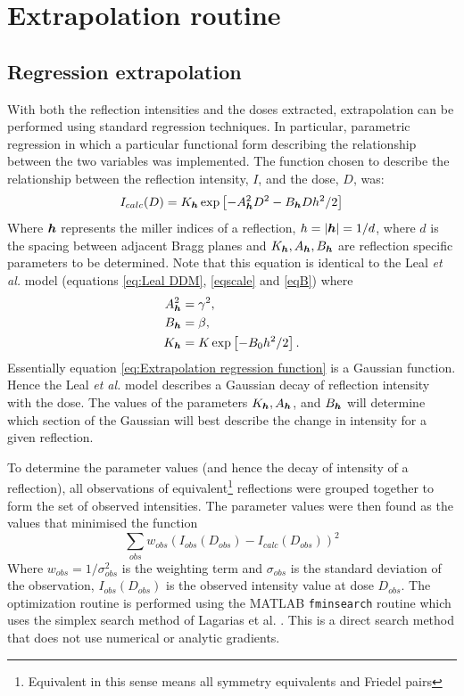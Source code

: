 \section{Extrapolation routine}
\label{sec:Extrapolation routine}

\subsection{Regression extrapolation}
\label{sub:Regression extrapolation}
With both the reflection intensities and the doses extracted, extrapolation can be performed using standard regression techniques.
In particular, parametric regression in which a particular functional form describing the relationship between the two variables was implemented.
The function chosen to describe the relationship between the reflection intensity, $I$, and the dose, $D$, was:
\begin{equation}
    I_{calc}(D) = K_{\boldsymbol{h}} \exp \left[- A^2_{\boldsymbol{h}}D^2 - B_{\boldsymbol{h}}D h^2/2 \right]
    \label{eq:Extrapolation regression function}
\end{equation}
Where $\boldsymbol{h}$ represents the miller indices of a reflection, $h = |\boldsymbol{h}| = 1/d$, where $d$ is the spacing between adjacent Bragg planes and $K_{\boldsymbol{h}}, A_{\boldsymbol{h}}, B_{\boldsymbol{h}}$ are reflection specific parameters to be determined.
Note that this equation is identical to the Leal \textit{et al.} model (equations \ref{eq:Leal DDM}, \ref{eqscale} and \ref{eqB}) where
\begin{align}
    A^2_{\boldsymbol{h}} &= \gamma^2, \\
    B_{\boldsymbol{h}} &= \beta, \\
    K_{\boldsymbol{h}} &= K\exp \left[ -B_0 h^2/2 \right].
\end{align}
Essentially equation \ref{eq:Extrapolation regression function} is a Gaussian function.
Hence the Leal \textit{et al.} model describes a Gaussian decay of reflection intensity with the dose.
The values of the parameters $K_{\boldsymbol{h}}, A_{\boldsymbol{h}}$, and $B_{\boldsymbol{h}}$ will determine which section of the Gaussian will best describe the change in intensity for a given reflection.

To determine the parameter values (and hence the decay of intensity of a reflection), all observations of equivalent\footnote{Equivalent in this sense means all symmetry equivalents and Friedel pairs} reflections were grouped together to form the set of observed intensities.
The parameter values were then found as the values that minimised the function
\begin{equation}
\sum_{obs} w_{obs}\left(I_{obs}(D_{obs}) - I_{calc}(D_{obs}) \right)^2
\label{eq:Extrapolation objective function}
\end{equation}
Where $w_{obs} = 1/\sigma_{obs}^2$ is the weighting term and $\sigma_{obs}$ is the standard deviation of the observation, $I_{obs}(D_{obs})$ is the observed intensity value at dose $D_{obs}$.
The optimization routine is performed using the MATLAB \verb|fminsearch| routine which uses the simplex search method of Lagarias et al. \cite{lagarias1998convergence}.
This is a direct search method that does not use numerical or analytic gradients.

